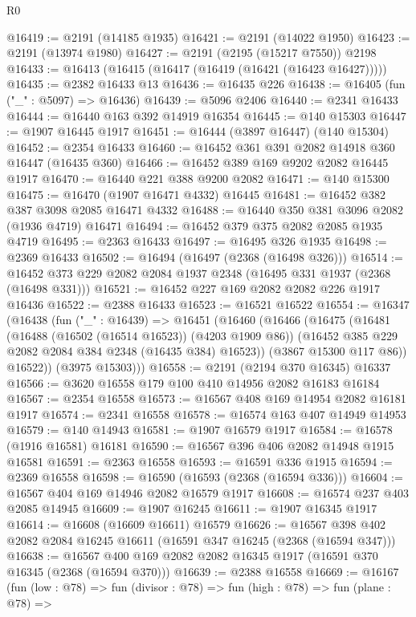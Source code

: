 \begin{lexlean}{R0}
\begin{coremodule}
@16419 := @2191 (@14185 @1935)
@16421 := @2191 (@14022 @1950)
@16423 := @2191 (@13974 @1980)
@16427 := @2191 (@2195 (@15217 @7550)) @2198
@16433 := @16413 (@16415 (@16417 (@16419 (@16421 (@16423 @16427)))))
@16435 := @2382 @16433 @13
@16436 := @16435 @226
@16438 := @16405 (fun ("_" : @5097) => @16436)
@16439 := @5096 @2406
@16440 := @2341 @16433
@16444 := @16440 @163 @392 @14919 @16354
@16445 := @140 @15303
@16447 := @1907 @16445 @1917
@16451 := @16444 (@3897 @16447) (@140 @15304)
@16452 := @2354 @16433
@16460 := @16452 @361 @391 @2082 @14918 @360 @16447 (@16435 @360)
@16466 := @16452 @389 @169 @9202 @2082 @16445 @1917
@16470 := @16440 @221 @388 @9200 @2082
@16471 := @140 @15300
@16475 := @16470 (@1907 @16471 @4332) @16445
@16481 := @16452 @382 @387 @3098 @2085 @16471 @4332
@16488 := @16440 @350 @381 @3096 @2082 (@1936 @4719) @16471
@16494 := @16452 @379 @375 @2082 @2085 @1935 @4719
@16495 := @2363 @16433
@16497 := @16495 @326 @1935
@16498 := @2369 @16433
@16502 := @16494 (@16497 (@2368 (@16498 @326)))
@16514 := @16452 @373 @229 @2082 @2084 @1937 @2348 (@16495 @331 @1937 (@2368 (@16498 @331)))
@16521 := @16452 @227 @169 @2082 @2082 @226 @1917 @16436
@16522 := @2388 @16433
@16523 := @16521 @16522
@16554 := @16347
    (@16438
      (fun ("_" : @16439) =>
      @16451
        (@16460
          (@16466
            (@16475
              (@16481
                (@16488 (@16502 (@16514 @16523)) (@4203 @1909 @86))
                (@16452 @385 @229 @2082 @2084 @384 @2348 (@16435 @384) @16523))
              (@3867 @15300 @117 @86))
            @16522))
        (@3975 @15303)))
@16558 := @2191 (@2194 @370 @16345) @16337
@16566 := @3620 @16558 @179 @100 @410 @14956 @2082 @16183 @16184
@16567 := @2354 @16558
@16573 := @16567 @408 @169 @14954 @2082 @16181 @1917
@16574 := @2341 @16558
@16578 := @16574 @163 @407 @14949 @14953
@16579 := @140 @14943
@16581 := @1907 @16579 @1917
@16584 := @16578 (@1916 @16581) @16181
@16590 := @16567 @396 @406 @2082 @14948 @1915 @16581
@16591 := @2363 @16558
@16593 := @16591 @336 @1915
@16594 := @2369 @16558
@16598 := @16590 (@16593 (@2368 (@16594 @336)))
@16604 := @16567 @404 @169 @14946 @2082 @16579 @1917
@16608 := @16574 @237 @403 @2085 @14945
@16609 := @1907 @16245
@16611 := @1907 @16345 @1917
@16614 := @16608 (@16609 @16611) @16579
@16626 := @16567 @398 @402 @2082 @2084 @16245 @16611 (@16591 @347 @16245 (@2368 (@16594 @347)))
@16638 := @16567 @400 @169 @2082 @2082 @16345 @1917 (@16591 @370 @16345 (@2368 (@16594 @370)))
@16639 := @2388 @16558
@16669 := @16167
    (fun (low : @78) =>
    fun (divisor : @78) =>
    fun (high : @78) =>
    fun (plane : @78) =>

\end{coremodule}
\end{lexlean}
